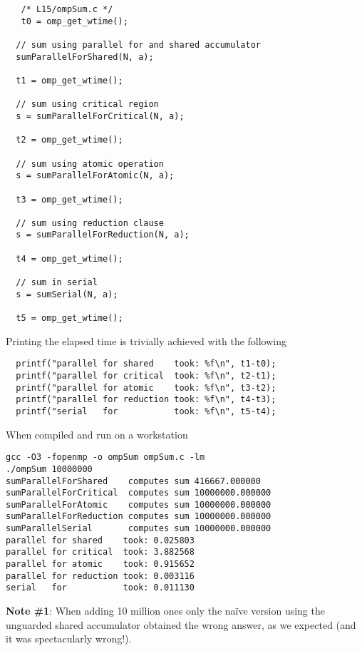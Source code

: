 \begin{verbatim}
   /* L15/ompSum.c */
   t0 = omp_get_wtime();

  // sum using parallel for and shared accumulator                                 
  sumParallelForShared(N, a);

  t1 = omp_get_wtime();

  // sum using critical region                                                     
  s = sumParallelForCritical(N, a);

  t2 = omp_get_wtime();

  // sum using atomic operation                                                    
  s = sumParallelForAtomic(N, a);

  t3 = omp_get_wtime();

  // sum using reduction clause                                                   
  s = sumParallelForReduction(N, a);

  t4 = omp_get_wtime();

  // sum in serial                                                               
  s = sumSerial(N, a);

  t5 = omp_get_wtime();
\end{verbatim}

Printing the elapsed time is trivially achieved with the following

\begin{verbatim}
  printf("parallel for shared    took: %f\n", t1-t0);
  printf("parallel for critical  took: %f\n", t2-t1);
  printf("parallel for atomic    took: %f\n", t3-t2);
  printf("parallel for reduction took: %f\n", t4-t3);
  printf("serial   for           took: %f\n", t5-t4);
\end{verbatim}

When compiled and run on a workstation

\begin{Verbatim}
gcc -O3 -fopenmp -o ompSum ompSum.c -lm
./ompSum 10000000
sumParallelForShared    computes sum 416667.000000
sumParallelForCritical  computes sum 10000000.000000
sumParallelForAtomic    computes sum 10000000.000000
sumParallelForReduction computes sum 10000000.000000
sumParallelSerial       computes sum 10000000.000000
parallel for shared    took: 0.025803
parallel for critical  took: 3.882568
parallel for atomic    took: 0.915652
parallel for reduction took: 0.003116
serial   for           took: 0.011130
\end{Verbatim}

{\bf Note \#1}: When adding 10 million ones only the na\"{i}ve version using the unguarded shared accumulator obtained the wrong answer, as we expected (and it was spectacularly wrong!). 

